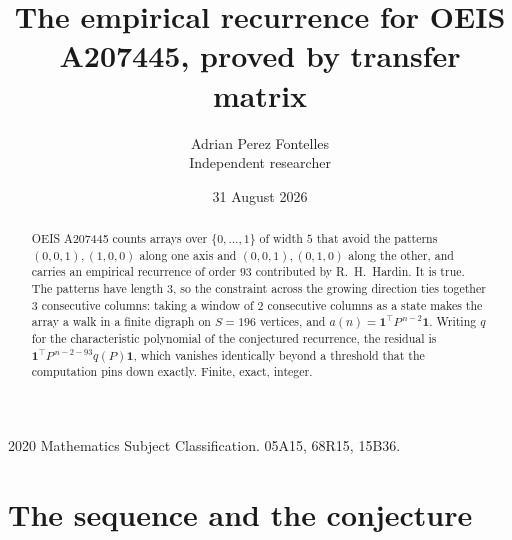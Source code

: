\documentclass[11pt,a4paper]{article}
\title{The empirical recurrence for OEIS A207445, proved by transfer matrix}
\author{Adrian Perez Fontelles\\ \small Independent researcher}
\date{31 August 2026}
\theoremstyle{plain}
\theoremstyle{definition}
\begin{document}
\maketitle

\begin{abstract}
OEIS A207445 counts arrays over $\{0,\dots,1\}$ of width $5$ that avoid the patterns
$(0,0,1), (1,0,0)$ along one axis and $(0,0,1), (0,1,0)$ along the other, and carries an empirical recurrence of
order $93$ contributed by R.~H.~Hardin. It is true. The patterns have length $3$, so
the constraint across the growing direction ties together $3$ consecutive columns: taking a
window of $2$ consecutive columns as a state makes the array a walk in a finite digraph
on $S=196$ vertices, and $a(n)=\mathbf{1}^{\!\top}P^{\,n-2}\mathbf{1}$. Writing $q$
for the characteristic polynomial of the conjectured recurrence, the residual is
$\mathbf{1}^{\!\top}P^{\,n-2-93}q(P)\mathbf{1}$, which vanishes identically
beyond a threshold that the computation pins down exactly. Finite, exact, integer.
\end{abstract}

\noindent\small 2020 Mathematics Subject Classification. 05A15, 68R15, 15B36.\normalsize

\section{The sequence and the conjecture}
\end{document}
